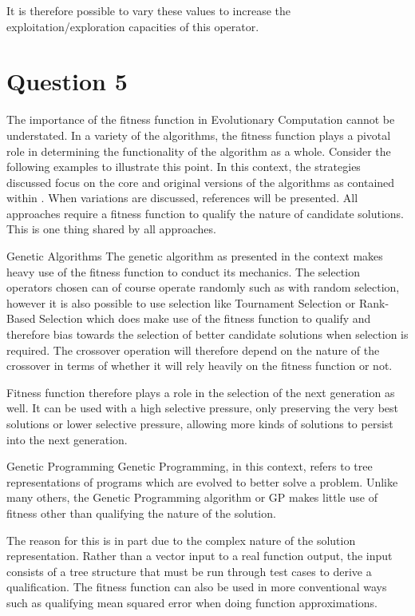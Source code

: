 \documentclass[12pt]{article}
\begin{document}
It is therefore possible to vary these values to increase the exploitation/exploration capacities of this operator.
\section{Question 5}
The importance of the fitness function in Evolutionary Computation cannot be understated. In a variety of the algorithms, the fitness function plays a pivotal role in determining the functionality of the algorithm as a whole. Consider the following examples to illustrate this point. In this context, the strategies discussed focus on the core and original versions of the algorithms as contained within \cite{engelCI02}. When variations are discussed, references will be presented. All approaches require a fitness function to qualify the nature of candidate solutions. This is one thing shared by all approaches.

Genetic Algorithms
The genetic algorithm as presented in the context makes heavy use of the fitness function to conduct its mechanics. The selection operators chosen can of course operate randomly such as with random selection, however it is also possible to use selection like Tournament Selection or Rank-Based Selection which does make use of the fitness function to qualify and therefore bias towards the selection of better candidate solutions when selection is required. The crossover operation will therefore depend on the nature of the crossover in terms of whether it will rely heavily on the fitness function or not.

Fitness function therefore plays a role in the selection of the next generation as well. It can be used with a high selective pressure, only preserving the very best solutions or lower selective pressure, allowing more kinds of solutions to persist into the next generation.

Genetic Programming
Genetic Programming, in this context, refers to tree representations of programs which are evolved to better solve a problem. Unlike many others, the Genetic Programming algorithm or GP makes little use of fitness other than qualifying the nature of the solution.

The reason for this is in part due to the complex nature of the solution representation. Rather than a vector input to a real function output, the input consists of a tree structure that must be run through test cases to derive a qualification. The fitness function can also be used in more conventional ways such as qualifying mean squared error when doing function approximations. 
\end{document}
